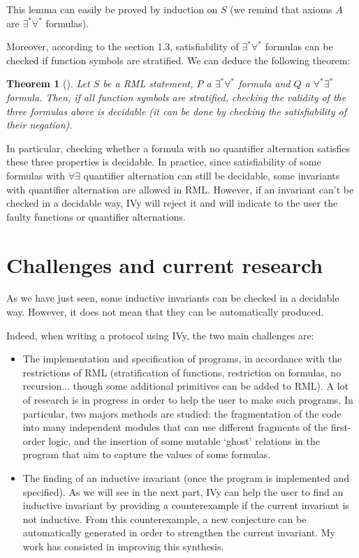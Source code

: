 \documentclass[11pt,a4paper,oldfontcommands,openany]{memoir}
\newtheorem*{theorem}{Theorem}
\begin{document}
    This lemma can easily be proved by induction on \(S\) (we remind that axioms \(A\) are \(\exists^*\forall^*\) formulas).
    
    Moreover, according to the section 1.3, satisfiability of \(\exists^*\forall^*\) formulas can be checked if function symbols are stratified.
    We can deduce the following theorem:

    \begin{theorem}[]
        Let \(S\) be a RML statement, \(P\) a \(\exists^*\forall^*\) formula and \(Q\) a \(\forall^*\exists^*\) formula.
        Then, if all function symbols are stratified, checking the validity of the three formulas above is decidable
        (it can be done by checking the satisfiability of their negation).
    \end{theorem}

    In particular, checking whether a formula with no quantifier alternation satisfies these three properties is decidable.
    In practice, since satisfiability of some formulas with \( \forall\exists \) quantifier alternation can still be decidable,
    some invariants with quantifier alternation are allowed in RML. However, if an invariant can't be checked in a decidable way, IVy will reject it
    and will indicate to the user the faulty functions or quantifier alternations.

    \section{Challenges and current research}

    As we have just seen, some inductive invariants can be checked in a decidable way.
    However, it does not mean that they can be automatically produced.

    Indeed, when writing a protocol using IVy, the two main challenges are:
    \begin{itemize}
        \item The implementation and specification of programs, in accordance with the restrictions of RML
        (stratification of functions, restriction on formulas, no recursion... though some additional primitives can be added to RML).
        A lot of research is in progress in order to help the user to make such programs. In particular, two majors methods are
        studied: the fragmentation of the code into many independent modules that can use different fragments of the first-order logic\cite{Taube:2018:MDD:3192366.3192414},
        and the insertion of some mutable `ghost' relations in the program that aim to capture the values of some formulas\cite{Padon:2017:PME:3152284.3140568}.
        
        \item The finding of an inductive invariant (once the program is implemented and specified). As we will see in the next part,
        IVy can help the user to find an inductive invariant by providing a counterexample if the current invariant is not inductive.
        From this counterexample, a new conjecture can be automatically generated in order to strengthen the current invariant.
        My work has consisted in improving this synthesis.
    \end{itemize}
\end{document}
